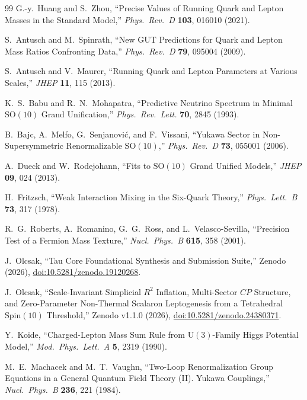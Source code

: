 \documentclass[11pt,a4paper]{article}
\begin{document}
\begin{thebibliography}{99}
G.-y.~Huang and S.~Zhou, ``Precise Values of Running Quark and Lepton Masses in the Standard Model,'' \emph{Phys.\ Rev.\ D} \textbf{103}, 016010 (2021).

S.~Antusch and M.~Spinrath, ``New GUT Predictions for Quark and Lepton Mass Ratios Confronting Data,'' \emph{Phys.\ Rev.\ D} \textbf{79}, 095004 (2009).

S.~Antusch and V.~Maurer, ``Running Quark and Lepton Parameters at Various Scales,'' \emph{JHEP} \textbf{11}, 115 (2013).

K.~S.~Babu and R.~N.~Mohapatra, ``Predictive Neutrino Spectrum in Minimal $\mathrm{SO}(10)$ Grand Unification,'' \emph{Phys.\ Rev.\ Lett.} \textbf{70}, 2845 (1993).

B.~Bajc, A.~Melfo, G.~Senjanovi\'c, and F.~Vissani, ``Yukawa Sector in Non-Supersymmetric Renormalizable $\mathrm{SO}(10)$,'' \emph{Phys.\ Rev.\ D} \textbf{73}, 055001 (2006).

A.~Dueck and W.~Rodejohann, ``Fits to $\mathrm{SO}(10)$ Grand Unified Models,'' \emph{JHEP} \textbf{09}, 024 (2013).

H.~Fritzsch, ``Weak Interaction Mixing in the Six-Quark Theory,'' \emph{Phys.\ Lett.\ B} \textbf{73}, 317 (1978).

R.~G.~Roberts, A.~Romanino, G.~G.~Ross, and L.~Velasco-Sevilla, ``Precision Test of a Fermion Mass Texture,'' \emph{Nucl.\ Phys.\ B} \textbf{615}, 358 (2001).

J.~Olcsak, ``Tau Core Foundational Synthesis and Submission Suite,'' Zenodo (2026), \href{https://doi.org/10.5281/zenodo.19120268}{doi:10.5281/zenodo.19120268}.

J.~Olcsak, ``Scale-Invariant Simplicial $R^2$ Inflation, Multi-Sector $CP$ Structure, and Zero-Parameter Non-Thermal Scalaron Leptogenesis from a Tetrahedral $\mathrm{Spin}(10)$ Threshold,'' Zenodo v1.1.0 (2026), \href{https://doi.org/10.5281/zenodo.24380371}{doi:10.5281/zenodo.24380371}.

Y.~Koide, ``Charged-Lepton Mass Sum Rule from $\mathrm{U}(3)$-Family Higgs Potential Model,'' \emph{Mod.\ Phys.\ Lett.\ A} \textbf{5}, 2319 (1990).

M.~E.~Machacek and M.~T.~Vaughn, ``Two-Loop Renormalization Group Equations in a General Quantum Field Theory (II). Yukawa Couplings,'' \emph{Nucl.\ Phys.\ B} \textbf{236}, 221 (1984).


\end{thebibliography}
\end{document}
